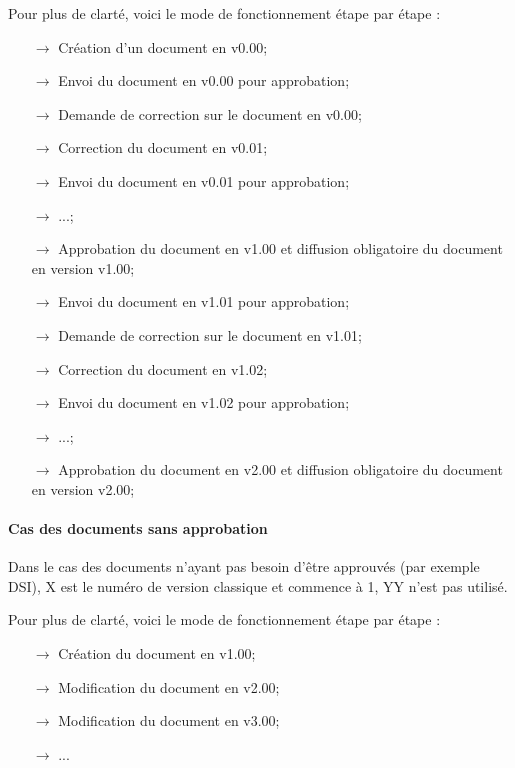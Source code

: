 Pour plus de clarté, voici le mode de fonctionnement étape par étape : 
\begin{itemize}
\item[$\rightarrow$] Création d'un document en v0.00;
\item[$\rightarrow$] Envoi du document en v0.00 pour approbation;
\item[$\rightarrow$] Demande de correction sur le document en v0.00;
\item[$\rightarrow$] Correction du document en v0.01;
\item[$\rightarrow$] Envoi du document en v0.01 pour approbation;
\item[$\rightarrow$] ...;
\item[$\rightarrow$] Approbation du document en v1.00 et diffusion obligatoire du document en version v1.00;
\item[$\rightarrow$] Envoi du document en v1.01 pour approbation;
\item[$\rightarrow$] Demande de correction sur le document en v1.01;
\item[$\rightarrow$] Correction du document en v1.02;
\item[$\rightarrow$] Envoi du document en v1.02 pour approbation;
\item[$\rightarrow$] ...;
\item[$\rightarrow$] Approbation du document en v2.00 et diffusion obligatoire du document en version v2.00;
\end{itemize}

\paragraph{Cas des documents sans approbation\\}

Dans le cas des documents n'ayant pas besoin d'être approuvés (par exemple DSI), X est le numéro de version classique et commence à 1, YY n'est pas utilisé.

Pour plus de clarté, voici le mode de fonctionnement étape par étape :
\begin{itemize}
\item[$\rightarrow$] Création du document en v1.00;
\item[$\rightarrow$] Modification du document en v2.00;
\item[$\rightarrow$] Modification du document en v3.00;
\item[$\rightarrow$] ...
\end{itemize}


